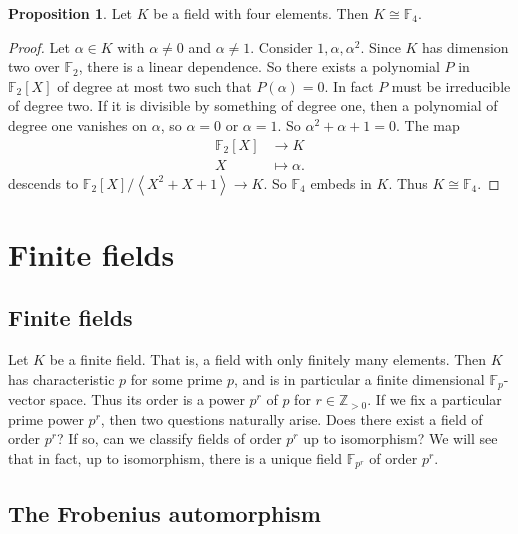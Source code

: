 \documentclass{article}
\newcommand{\F}{\mathbb{F}}
\newcommand{\Z}{\mathbb{Z}}
\newcommand{\rb}[1]{\left( #1 \right)}
\renewcommand{\sb}[1]{\left[ #1 \right]}
\newcommand{\ab}[1]{\left\langle #1 \right\rangle}
\theoremstyle{definition}\newtheorem{definition}{Definition}[subsection]
\theoremstyle{definition}\newtheorem{remark}[definition]{Remark}
\theoremstyle{definition}\newtheorem*{example}{Example}
\theoremstyle{definition}\newtheorem*{note}{Note}
\newtheorem{proposition}[definition]{Proposition}
\begin{document}
\begin{proposition}
Let $ K $ be a field with four elements. Then $ K \cong \F_4 $.
\end{proposition}

\begin{proof}
Let $ \alpha \in K $ with $ \alpha \ne 0 $ and $ \alpha \ne 1 $. Consider $ 1, \alpha, \alpha^2 $. Since $ K $ has dimension two over $ \F_2 $, there is a linear dependence. So there exists a polynomial $ P $ in $ \F_2\sb{X} $ of degree at most two such that $ P\rb{\alpha} = 0 $. In fact $ P $ must be irreducible of degree two. If it is divisible by something of degree one, then a polynomial of degree one vanishes on $ \alpha $, so $ \alpha = 0 $ or $ \alpha = 1 $. So $ \alpha^2 + \alpha + 1 = 0 $. The map
\begin{align*}
\F_2\sb{X} & \to K \\
X & \mapsto \alpha.
\end{align*}
descends to $ \F_2\sb{X} / \ab{X^2 + X + 1} \to K $. So $ \F_4 $ embeds in $ K $. Thus $ K \cong \F_4 $.
\end{proof}

\pagebreak


\section{Finite fields}

\subsection{Finite fields}

Let $ K $ be a finite field. That is, a field with only finitely many elements. Then $ K $ has characteristic $ p $ for some prime $ p $, and is in particular a finite dimensional $ \F_p $-vector space. Thus its order is a power $ p^r $ of $ p $ for $ r \in \Z_{> 0} $. If we fix a particular prime power $ p^r $, then two questions naturally arise. Does there exist a field of order $ p^r $? If so, can we classify fields of order $ p^r $ up to isomorphism? We will see that in fact, up to isomorphism, there is a unique field $ \F_{p^r} $ of order $ p^r $.

\subsection{The Frobenius automorphism}
\end{document}
